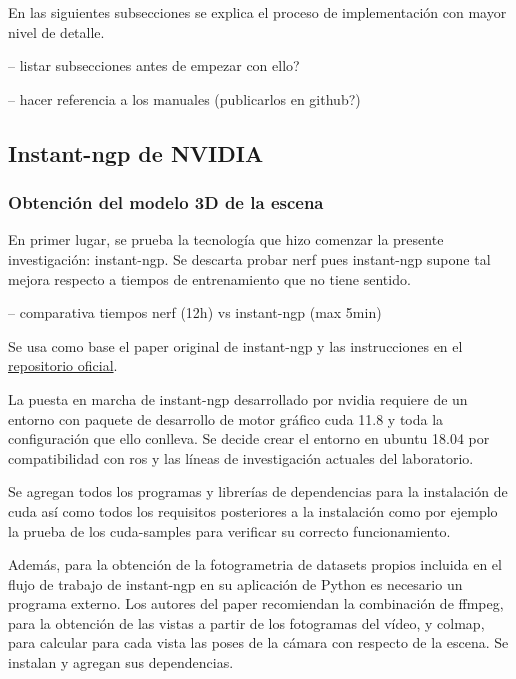 \documentclass[a4paper, 12pt, spanish, twoside]{article}
\begin{document}
En las siguientes subsecciones se explica el proceso de implementación con mayor nivel de detalle. 

-- listar subsecciones antes de empezar con ello? 

-- hacer referencia a los manuales (publicarlos en github?) 

\subsection{Instant-ngp de NVIDIA} \label{sec:implementacion:instant-ngp}

\subsubsection{Obtención del modelo 3D de la escena} \label{sec:implementacion:instant-ngp:obtencion}

En primer lugar, se prueba la tecnología que hizo comenzar la presente investigación: \gls{instant-ngp}. Se descarta probar \acrshort{nerf} pues \gls{instant-ngp} supone tal mejora respecto a tiempos de entrenamiento que no tiene sentido.  

-- comparativa tiempos nerf (12h) vs instant-ngp (max 5min) 

Se usa como base el paper original de \gls{instant-ngp} y las instrucciones en el \href{https://github.com/NVlabs/instant-ngp}{repositorio oficial}.  

La puesta en marcha de \gls{instant-ngp} desarrollado por \gls{nvidia} requiere de un entorno con paquete de desarrollo de motor gráfico \acrshort{cuda} 11.8 y toda la configuración que ello conlleva. Se decide crear el entorno en \gls{ubuntu} 18.04 por compatibilidad con \acrshort{ros} y las líneas de investigación actuales del laboratorio. 

Se agregan todos los programas y librerías de dependencias para la instalación de \acrshort{cuda} así como todos los requisitos posteriores a la instalación como por ejemplo la prueba de los \gls{cuda-samples} para verificar su correcto funcionamiento. 

Además, para la obtención de la \gls{fotogrametria} de \glspl{dataset} propios incluida en el flujo de trabajo de \gls{instant-ngp} en su aplicación de Python es necesario un programa externo. Los autores del paper recomiendan la combinación de \gls{ffmpeg}, para la obtención de las vistas a partir de los fotogramas del vídeo, y \gls{colmap}, para calcular para cada vista las poses de la cámara con respecto de la escena. Se instalan y agregan sus dependencias. 
\end{document}
